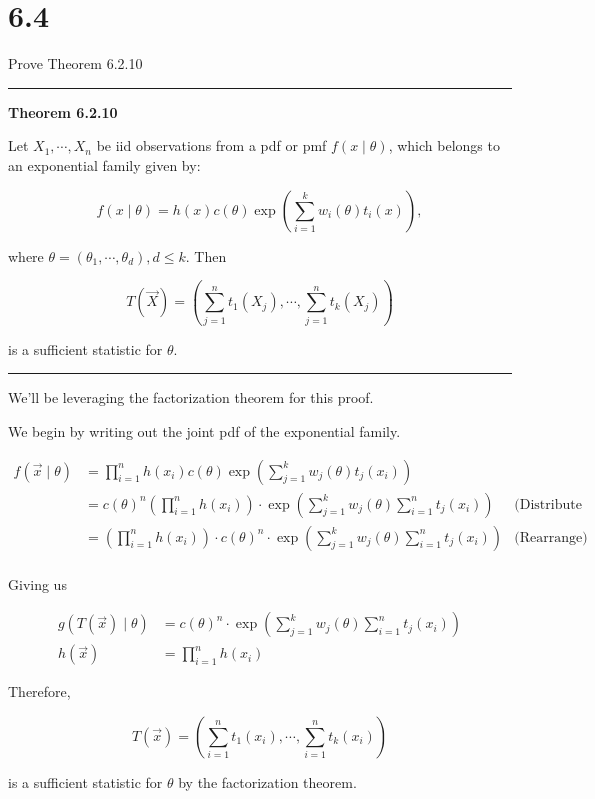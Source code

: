 \section*{6.4}

Prove Theorem 6.2.10

\vspace{5mm}
\hrule
\vspace{5mm}
\noindent\textbf{Theorem 6.2.10}

Let $X_1, \cdots, X_n$ be iid observations from a pdf or pmf $f(x\mid\theta)$, which belongs to an exponential family given by:

\[
	f(x\mid\theta) = h(x)c(\theta)\exp\left( \sum_{i=1}^k w_i(\theta)t_i(x) \right),
\]

where $\theta = (\theta_1, \cdots, \theta_d), d \leq k$. Then

\[T(\vec{X}) = \left( \sum_{j=1}^n t_1(X_j), \cdots, \sum_{j=1}^n t_k(X_j)\right)\]

is a sufficient statistic for $\theta$.

\vspace{5mm}
\hrule
\vspace{5mm}

\noindent We'll be leveraging the factorization theorem for this proof.

We begin by writing out the joint pdf of the exponential family.

\begin{align*}
	f(\vec{x}\mid\theta) &= \prod_{i=1}^n h(x_i)c(\theta)\exp\left( \sum_{j=1}^k w_j(\theta)t_j(x_i) \right) \\
	&= c(\theta)^n \left( \prod_{i=1}^n h(x_i) \right) \cdot \exp\left( \sum_{j=1}^k w_j(\theta) \sum_{i=1}^n t_j(x_i) \right) &\text{(Distribute product)} \\
	&=\left( \prod_{i=1}^n h(x_i) \right) \cdot  c(\theta)^n \cdot \exp\left( \sum_{j=1}^k w_j(\theta) \sum_{i=1}^n t_j(x_i) \right) &\text{(Rearrange)}\\ 
\end{align*}

Giving us 

\vspace{-5mm}
\begin{align*}
	g(T(\vec{x}) \mid \theta) &=  c(\theta)^n \cdot \exp\left( \sum_{j=1}^k w_j(\theta) \sum_{i=1}^n t_j(x_i) \right) \\
	h(\vec{x}) &= \prod_{i=1}^n h(x_i)
\end{align*}

Therefore,

\[
	T(\vec{x}) = \left( \sum_{i=1}^n t_1(x_i), \cdots, \sum_{i=1}^n t_k(x_i)  \right)
\]

is a sufficient statistic for $\theta$ by the factorization theorem.
